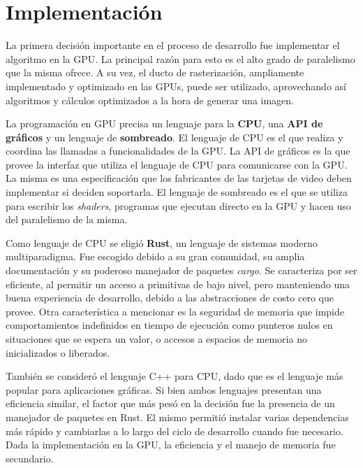 \graphicspath{{chapters/4_implementación/figures}}

\chapter{Implementación}\label{chap:implementation}

La primera decisión importante en el proceso de desarrollo fue implementar el algoritmo en la GPU.
La principal razón para esto es el alto grado de paralelismo que la misma ofrece.
A su vez, el ducto de rasterización, ampliamente implementado y optimizado en las GPUs, puede ser utilizado, aprovechando así algoritmos y cálculos optimizados a la hora de generar una imagen.

La programación en GPU precisa un lenguaje para la \textbf{CPU}, una \textbf{API de gráficos} y un lenguaje de \textbf{sombreado}.
El lenguaje de CPU es el que realiza y coordina las llamadas a funcionalidades de la GPU.
La API de gráficos es la que provee la interfaz que utiliza el lenguaje de CPU para comunicarse con la GPU.
La misma es una especificación que los fabricantes de las tarjetas de video deben implementar si deciden soportarla.
El lenguaje de sombreado es el que se utiliza para escribir los \textit{shaders}, programas que ejecutan directo en la GPU y hacen uso del paralelismo de la misma.

Como lenguaje de CPU se eligió \textbf{Rust}, un lenguaje de sistemas moderno multiparadigma.
Fue escogido debido a su gran comunidad, su amplia documentación y su poderoso manejador de paquetes \textit{cargo}.  
Se caracteriza por ser eficiente, al permitir un acceso a primitivas de bajo nivel, pero manteniendo una buena experiencia de desarrollo, debido a las abstracciones de costo cero que provee.
Otra característica a mencionar es la seguridad de memoria que impide comportamientos indefinidos en tiempo de ejecución como punteros nulos en situaciones que se espera un valor, o accesos a espacios de memoria no inicializados o liberados.

También se consideró el lenguaje C++ para CPU, dado que es el lenguaje más popular para aplicaciones gráficas.  
Si bien ambos lenguajes presentan una eficiencia similar, el factor que más pesó en la decisión fue la presencia de un manejador de paquetes en Rust.
El mismo permitió instalar varias dependencias más rápido y cambiarlas a lo largo del ciclo de desarrollo cuando fue necesario.
Dada la implementación en la GPU, la eficiencia y el manejo de memoria fue secundario. 


